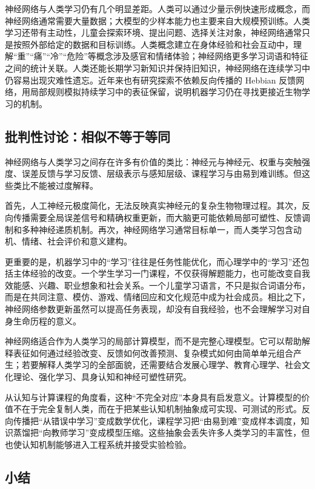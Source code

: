 \documentclass[UTF8,zihao=5,a4paper]{ctexart}
\begin{document}
神经网络与人类学习仍有几个明显差距。人类可以通过少量示例快速形成概念，而神经网络通常需要大量数据；大模型的少样本能力也主要来自大规模预训练。人类学习还带有主动性，儿童会探索环境、提出问题、选择关注对象，神经网络通常只是按照外部给定的数据和目标训练。人类概念建立在身体经验和社会互动中，理解“重”“痛”“冷”“危险”等概念涉及感官和情绪体验；神经网络更多学习词语和特征之间的统计关联。人类还能长期学习新知识并保持旧知识，神经网络在连续学习中仍容易出现灾难性遗忘。近年来也有研究探索不依赖反向传播的 Hebbian 反馈网络，用局部规则模拟持续学习中的表征保留\cite{li2026hebbiancontinual}，说明机器学习仍在寻找更接近生物学习的机制。

\subsection{批判性讨论：相似不等于等同}

神经网络与人类学习之间存在许多有价值的类比：神经元与神经元、权重与突触强度、误差反馈与学习反馈、层级表示与感知层级、课程学习与由易到难训练。但这些类比不能被过度解释。

首先，人工神经元极度简化，无法反映真实神经元的复杂生物物理过程。其次，反向传播需要全局误差信号和精确权重更新，而大脑更可能依赖局部可塑性、反馈调制和多种神经递质机制。再次，神经网络学习通常目标单一，而人类学习包含动机、情绪、社会评价和意义建构。

更重要的是，机器学习中的“学习”往往是任务性能优化，而心理学中的“学习”还包括主体经验的改变。一个学生学习一门课程，不仅获得解题能力，也可能改变自我效能感、兴趣、职业想象和社会关系。一个儿童学习语言，不只是拟合词语分布，而是在共同注意、模仿、游戏、情绪回应和文化规范中成为社会成员。相比之下，神经网络参数更新虽然可以提高任务表现，却没有自我经验，也不会理解学习对自身生命历程的意义。

神经网络适合作为人类学习的局部计算模型，而不是完整心理模型。它可以帮助解释表征如何通过经验改变、反馈如何改善预测、复杂模式如何由简单单元组合产生；若要解释人类学习的全部面貌，还需要结合发展心理学、教育心理学、社会文化理论、强化学习、具身认知和神经可塑性研究。

从认知与计算课程的角度看，这种“不完全对应”本身具有启发意义。计算模型的价值不在于完全复制人类，而在于把某些认知机制抽象成可实现、可测试的形式。反向传播把“从错误中学习”变成数学优化，课程学习把“由易到难”变成样本调度，知识蒸馏把“向教师学习”变成模型压缩。这些抽象会丢失许多人类学习的丰富性，但也使认知机制能够进入工程系统并接受实验检验。

\subsection{小结}
\end{document}
